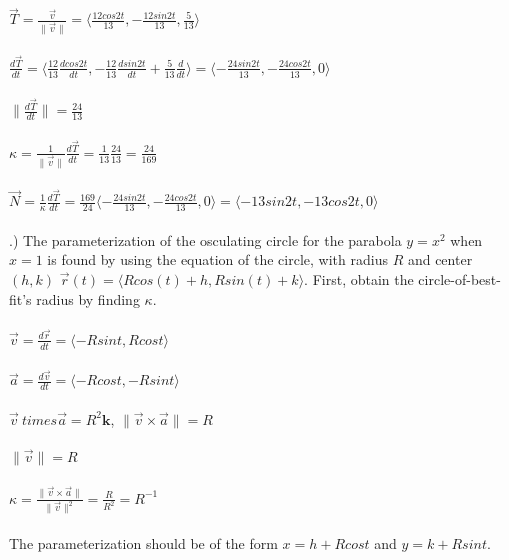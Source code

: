 \documentclass[12pt]{article}
\begin{document}
\noindent $\vec{T} = \frac{\vec{v}}{\| \vec{v} \|} = \langle \frac{12cos{2t}}{13}, -\frac{12sin{2t}}{13}, \frac{5}{13}\rangle$\\\\
\noindent $\frac{d\vec{T}}{dt} = \langle \frac{12}{13}\frac{dcos{2t}}{dt} , -\frac{12}{13}\frac{dsin{2t}}{dt} + \frac{5}{13}\frac{d}{dt}\rangle
= \langle -\frac{24sin{2t}}{13}, -\frac{24cos{2t}}{13}, 0 \rangle$\\\\
\noindent $\| \frac{d\vec{T}}{dt} \|  = \frac{24}{13}$\\\\
\noindent $\kappa = \frac{1}{\| \vec{v} \| }\frac{d\vec{T}}{dt} = \frac{1}{13}\frac{24}{13} =\frac{24}{169}$\\\\
\noindent $\vec{N} = \frac{1}{\kappa}\frac{d\vec{T}}{dt} = \frac{169}{24}\langle -\frac{24sin{2t}}{13}, -\frac{24cos{2t}}{13}, 0\rangle 
 = \langle -13sin{2t}, -13cos{2t}, 0\rangle $\\\\
.) The parameterization of the osculating circle for the parabola $y = x^{2}$ when $x = 1$ is found 
by using the equation of the circle, with radius $R$ and center $(h,k)$ $\vec{r}(t) = \langle Rcos(t) + h, Rsin(t) + k \rangle$. First, obtain the circle-of-best-fit's radius by finding $\kappa$.\\\\
\noindent $\vec{v} = \frac{d\vec{r}}{dt} = \langle -Rsin{t}, Rcos{t}\rangle$\\\\
\noindent $\vec{a} = \frac{d\vec{v}}{dt} = \langle -Rcos{t}, -Rsin{t}\rangle$\\\\
\noindent $\vec{v} \ times \vec{a} = R^{2}\mathbf{k}$, \hspace{10pt} $\| \vec{v} \times \vec{a} \|  = R$\\\\
\noindent $\|\vec{v}\| = R$\\\\
\noindent $\kappa = \frac{\| \vec{v} \times \vec{a} \|}{\| \vec{v} \| ^{2}} =  \frac{R}{R^{2}} = R^{-1}$\\\\
\noindent The parameterization should be of the form $x = h + Rcos{t}$ and $y = k + Rsin{t}$. \\\\

 \clearpage
\end{document}
